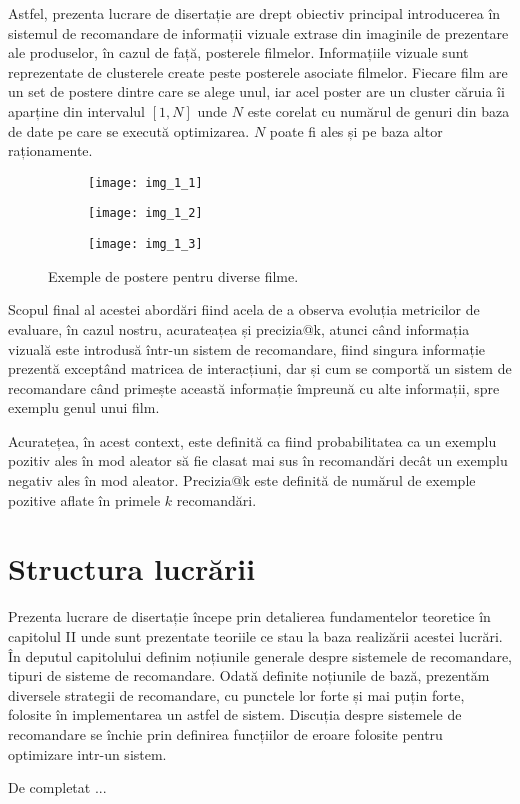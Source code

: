 Astfel, prezenta lucrare de disertație are drept obiectiv principal introducerea în sistemul de recomandare de informații vizuale extrase din imaginile de prezentare ale produselor, în cazul de față, posterele filmelor. Informațiile vizuale sunt reprezentate de clusterele create peste posterele asociate filmelor. Fiecare film are un set de postere dintre care se alege unul, iar acel poster are un cluster căruia îi aparține din intervalul $[1, N]$ unde $N$ este corelat cu numărul de genuri din baza de date pe care se execută optimizarea. $N$ poate fi ales și pe baza altor raționamente.

\begin{figure}[!htbp]
  \begin{subfigure}[b]{0.3\textwidth}
    \texttt{[image: img\_1\_1]}
  \end{subfigure}
  \hfill
  \begin{subfigure}[b]{0.3\textwidth}
    \texttt{[image: img\_1\_2]}
  \end{subfigure}
  \hfill
  \begin{subfigure}[b]{0.3\textwidth}
    \texttt{[image: img\_1\_3]}
  \end{subfigure}
  \caption[Exemple de postere]{Exemple de postere pentru diverse filme.}
\end{figure}

Scopul final al acestei abordări fiind acela de a observa evoluția metricilor de evaluare, în cazul nostru, acurateațea și precizia@k, atunci când informația vizuală este introdusă într-un sistem de recomandare, fiind singura informație prezentă exceptând matricea de interacțiuni, dar și cum se comportă un sistem de recomandare când primește această informație împreună cu alte informații, spre exemplu genul unui film.

Acuratețea, în acest context, este definită ca fiind probabilitatea ca un exemplu pozitiv ales în mod aleator să fie clasat mai sus în recomandări decât un exemplu negativ ales în mod aleator. Precizia@k este definită de numărul de exemple pozitive aflate în primele $k$ recomandări.

\section{Structura lucrării}
Prezenta lucrare de disertație începe prin detalierea fundamentelor teoretice în capitolul II unde sunt prezentate teoriile ce stau la baza realizării acestei lucrări. În deputul capitolului definim noțiunile generale despre sistemele de recomandare, tipuri de sisteme de recomandare. Odată definite noțiunile de bază, prezentăm diversele strategii de recomandare, cu punctele lor forte și mai puțin forte, folosite în implementarea un astfel de sistem. Discuția despre sistemele de recomandare se închie prin definirea funcțiilor de eroare folosite pentru optimizare intr-un sistem.

\vspace{5mm}
De completat ...